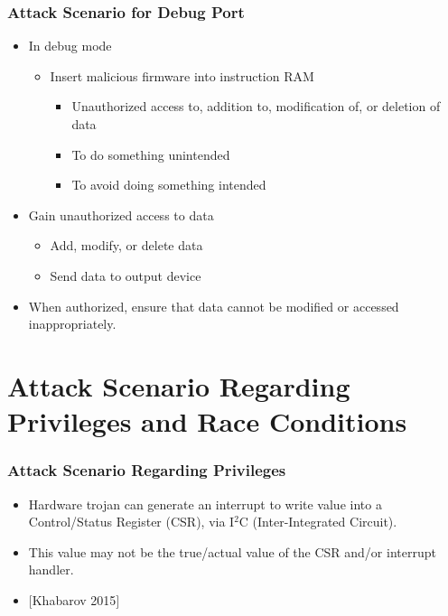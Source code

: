 \documentclass[xcolor={usenames,dvipsnames},hyperref={hyperindex,bookmarks}]{beamer}
\begin{document}
\frame
{
	\frametitle{Attack Scenario for Debug Port}

	\begin{itemize}
	\item In debug mode
		\begin{itemize}
		\item Insert malicious firmware into instruction RAM
			\begin{itemize}
			\item Unauthorized access to, addition to, modification of, or deletion of data
			\item To do something unintended
			\item To avoid doing something intended
			\end{itemize}
		\end{itemize}
	\item Gain unauthorized access to data
		\begin{itemize}
		\item Add, modify, or delete data
		\item Send data to output device
		\end{itemize}
	\item When authorized, ensure that data cannot be modified or accessed inappropriately.
	\end{itemize}



}








\section{Attack Scenario Regarding Privileges and Race Conditions}

\frame
{
	\frametitle{Attack Scenario Regarding Privileges}

	\begin{itemize}
	\item Hardware trojan can generate an interrupt to write value into a Control/Status Register (CSR), via I$^{2}$C (Inter-Integrated Circuit).
	\item This value may not be the true/actual value of the CSR and/or interrupt handler.
	\item $[$Khabarov 2015$]$
	\end{itemize}
}
\end{document}
